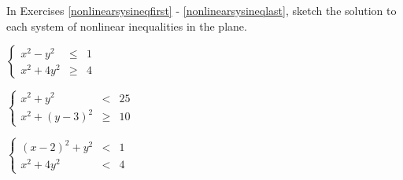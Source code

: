 \documentclass{ximera}
\begin{document}
	\author{Stitz-Zeager}



\label{ExercisesforNonLinearInequalities}

\begin{question}
In Exercises \ref{nonlinearsysineqfirst} - \ref{nonlinearsysineqlast}, sketch the solution to each system of nonlinear inequalities in the plane.

\begin{problem}\label{nonlinearsysineqfirst}
$\left\{\begin{array}{rcr}  x^{2} - y^{2} & \leq & 1 \\ x^{2} + 4y^{2} & \geq & 4  \end{array} \right.$

\begin{solution}
\begin{center} 
\end{center}
\end{solution}
\end{problem}

\begin{problem}
$\left\{\begin{array}{rcr}  x^{2} + y^{2} & < & 25 \\ x^{2} + (y - 3)^{2} & \geq & 10  \end{array} \right.$

\begin{solution}
\begin{center} 
\end{center}
\end{solution}
\end{problem}

\begin{problem}
$\left\{\begin{array}{rcr}  (x - 2)^{2} + y^{2} & < & 1 \\ x^{2} + 4y^{2} & < & 4  \end{array} \right.$

\begin{solution}
\begin{center} 
\end{center}
\end{solution}
\end{problem}


\end{question}
\end{document}
